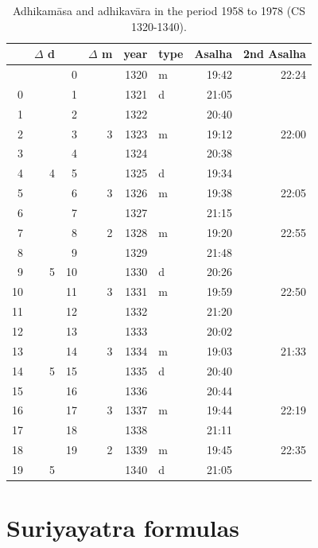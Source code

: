 \documentclass[11pt,oneside]{memoir-article}
\begin{document}
\begin{table}[h]
\caption{\label{tbl-calendars-1958} Adhikamāsa and adhikavāra in the period 1958 to 1978 (CS 1320-1340).\autocite{eade-interpolation}}
\centering
\begin{tabular}{rrrrrlrr}
 & $\Delta$ d &  & $\Delta$ m & year & type & Asalha & 2nd Asalha\\
\hline
 &  & 0 &  & 1320 & m & 19:42 & 22:24\\
0 &  & 1 &  & 1321 & d & 21:05 & \\
1 &  & 2 &  & 1322 &  & 20:40 & \\
2 &  & 3 & 3 & 1323 & m & 19:12 & 22:00\\
3 &  & 4 &  & 1324 &  & 20:38 & \\
4 & 4 & 5 &  & 1325 & d & 19:34 & \\
5 &  & 6 & 3 & 1326 & m & 19:38 & 22:05\\
6 &  & 7 &  & 1327 &  & 21:15 & \\
7 &  & 8 & 2 & 1328 & m & 19:20 & 22:55\\
8 &  & 9 &  & 1329 &  & 21:48 & \\
9 & 5 & 10 &  & 1330 & d & 20:26 & \\
10 &  & 11 & 3 & 1331 & m & 19:59 & 22:50\\
11 &  & 12 &  & 1332 &  & 21:20 & \\
12 &  & 13 &  & 1333 &  & 20:02 & \\
13 &  & 14 & 3 & 1334 & m & 19:03 & 21:33\\
14 & 5 & 15 &  & 1335 & d & 20:40 & \\
15 &  & 16 &  & 1336 &  & 20:44 & \\
16 &  & 17 & 3 & 1337 & m & 19:44 & 22:19\\
17 &  & 18 &  & 1338 &  & 21:11 & \\
18 &  & 19 & 2 & 1339 & m & 19:45 & 22:35\\
19 & 5 &  &  & 1340 & d & 21:05 & \\
\end{tabular}
\end{table}

\spewnotes

\clearpage

\chapter{Suriyayatra formulas}
\label{sec-4}
\label{suriyayatra-formulas}
\end{document}
